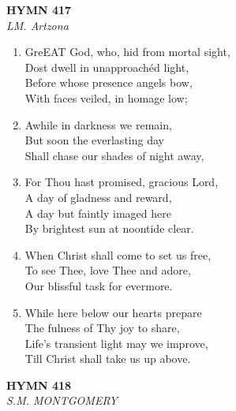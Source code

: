 \documentclass[11pt,a4paper]{article}
\begin{document}
\newpage
\begin{center}
    {\Large \textbf{HYMN 417}}
    \\
    \textit{LM. Artzona}
\end{center}
\vspace{1em}

\begin{enumerate}
    \item GreEAT God, who, hid from mortal sight, \\
        Dost dwell in unapproachéd light, \\
        Before whose presence angels bow, \\
        With faces veiled, in homage low;

    \item Awhile in darkness we remain, \\
        But soon the everlasting day \\
        Shall chase our shades of night away,

    \item For Thou hast promised, gracious Lord, \\
        A day of gladness and reward, \\
        A day but faintly imaged here \\
        By brightest sun at noontide clear.

    \item When Christ shall come to set us free, \\
        To see Thee, love Thee and adore, \\
        Our blissful task for evermore.

    \item While here below our hearts prepare \\
        The fulness of Thy joy to share, \\
        Life's transient light may we improve, \\
        Till Christ shall take us up above.

\end{enumerate}

\newpage
\begin{center}
    {\Large \textbf{HYMN 418}}
    \\
    \textit{S.M. MONTGOMERY}
\end{center}
\vspace{1em}
\end{document}
